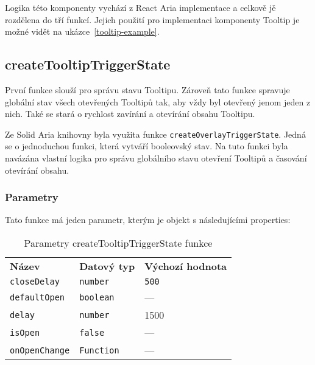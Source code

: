 Logika této komponenty vychází z React Aria implementace a celkově jě rozdělena do tří funkcí.
Jejich použití pro implementaci komponenty Tooltip je možné vidět na ukázce~\ref{tooltip-example}.

\clearpage

\subsection{createTooltipTriggerState}

První funkce slouží pro správu stavu Tooltipu.
Zároveň tato funkce spravuje globální stav všech otevřených Tooltipů tak, aby vždy byl otevřený jenom jeden z nich.
Také se stará o rychlost zavírání a otevírání obsahu Tooltipu.

Ze Solid Aria knihovny byla využita funkce \texttt{createOverlayTriggerState}.
Jedná se o jednoduchou funkci, která vytváří booleovský stav.
Na tuto funkci byla navázána vlastní logika pro správu globálního stavu otevření Tooltipů a časování otevírání obsahu.

\subsubsection{Parametry}

Tato funkce má jeden parametr, kterým je objekt s následujícími properties:

\begin{table}[ht]\label{table:tooltip-trigger-state-params}
    \begin{ctucolortab}
        \begin{tabularx}{\textwidth}{X X X}
            \bfseries Název       & \bfseries Datový typ & \bfseries Výchozí hodnota \\\Midrule{}
            \texttt{closeDelay}   & \texttt{number}      & \texttt{500}              \\
            \texttt{defaultOpen}  & \texttt{boolean}     & ---                       \\
            \texttt{delay}        & \texttt{number}      & 1500                      \\
            \texttt{isOpen}       & \texttt{false}       & ---                       \\
            \texttt{onOpenChange} & \texttt{Function}    & ---
        \end{tabularx}
    \end{ctucolortab}
    \caption{Parametry createTooltipTriggerState funkce}
\end{table}

